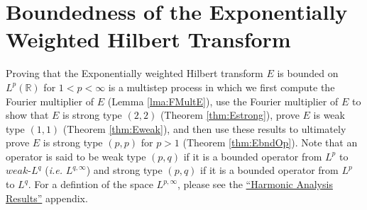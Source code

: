 \documentclass[../dissertation.tex]{subfiles}
\begin{document}
\section{Boundedness of the Exponentially Weighted Hilbert Transform}\label{sec3:BndE}

Proving that the Exponentially weighted Hilbert transform $E$ is bounded on 
$L^p(\mathbb R)$ for $1< p < \infty$ is a multistep process in which we first compute
the Fourier multiplier of $E$ (Lemma \ref{lma:FMultE}), use the Fourier multiplier
of $E$ to show that $E$ is strong type $(2,2)$ (Theorem \ref{thm:Estrong}), prove $E$ is 
weak type $(1, 1)$ (Theorem \ref{thm:Eweak}), and then use these results to ultimately
prove $E$ is strong type $(p, p)$ for $p>1$ (Theorem \ref{thm:EbndOp}). Note that an 
operator is said to be weak type $(p,q)$ if it is a bounded operator from $L^p$ to 
$weak$-$L^q$ (\textit{i.e.} $L^{q, \infty}$) and strong type $(p,q)$ if it 
is a bounded operator from $L^p$ to $L^q$. For a defintion of the space
$L^{p,\infty}$, please see the \hyperref[app:HA]{``Harmonic Analysis Results''} 
appendix.
\end{document}
